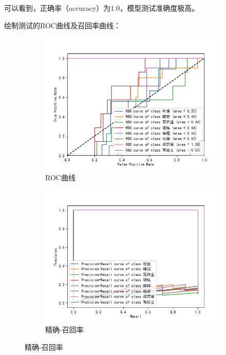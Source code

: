 \documentclass[UTF8,a4paper,15pt,titlepage,oneside]{ctexbook}
\begin{document}
可以看到，正确率（accuracy）为1.0，模型测试准确度极高。

绘制测试的ROC曲线及召回率曲线：

\begin{figure}[H]
  \centering
  \centering
  
  \begin{subfigure}{0.45\textwidth}
    \includegraphics[width=\linewidth]{pictures/24.png}
    \caption{ROC曲线}
  \end{subfigure}
  \begin{subfigure}{0.45\textwidth}
    \includegraphics[width=\linewidth]{pictures/25.png}
    \caption{精确-召回率}
  \end{subfigure}
  
\end{figure}
\end{document}
